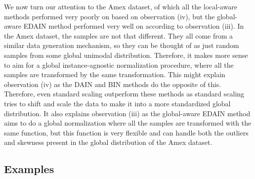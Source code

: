 \documentclass{statsmsc}
\begin{document}
{We now turn our attention to the Amex dataset, of which all the local-aware methods performed very
poorly on based on observation (iv), but the global-aware \ac{EDAIN} method performed very well on
according to observation (iii).
In the Amex dataset, the samples are not that different. They all come from a
similar data generation mechanism, so they can be thought of as just random samples
from some global unimodal distribution.
Therefore, it makes more sense to aim for a global instance-agnostic
normalization procedure, where all the samples are transformed by the same transformation.
This might explain observation (iv) as the \ac{DAIN} and \ac{BIN} methods do the opposite of this.
Therefore, even standard scaling outperform these methods as standard scaling tries to shift and
scale the data to make it into a more standardized global distribution.
It also explains observation (iii) as the global-aware \ac{EDAIN} method aims to do a global
normalization where all the samples are transformed with the same function, but this function is
very flexible and can handle both the outliers and skewness present in the global distribution
of the Amex dataset.



\subsection{Examples}%
\label{sub:Examples}

}
\end{document}
